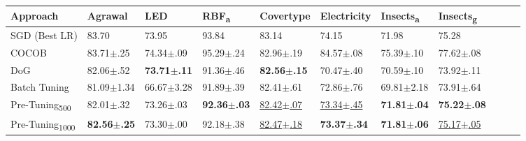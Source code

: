 \begin{tabular}{lllllllllll}
    \toprule
    Approach                       & Agrawal                 & LED                     & RBF\textsubscript{a}    & Covertype                 & Electricity               & Insects\textsubscript{a} & Insects\textsubscript{g}  \\
    \midrule
    SGD (Best LR)                  & 83.70                   & 73.95                   & 93.84                   & 83.14                     & 74.15                     & 71.98                    & 75.28                     \\
    COCOB                          & 83.71$\pm$.25           & 74.34$\pm$.09           & 95.29$\pm$.24           & 82.96$\pm$.19             & 84.57$\pm$.08             & 75.39$\pm$.10            & 77.62$\pm$.08             \\ \midrule
    DoG                            & 82.06$\pm$.52           & \bfseries 73.71$\pm$.11 & 91.36$\pm$.46           & \bfseries 82.56$\pm$.15   & 70.47$\pm$.40             & 70.59$\pm$.10            & 73.92$\pm$.11             \\
    Batch Tuning                   & 81.09$\pm$1.34          & 66.67$\pm$3.28          & 91.89$\pm$.39           & 82.41$\pm$.61             & 72.86$\pm$.76             & 69.81$\pm$2.18           & 73.91$\pm$.64             \\
    Pre-Tuning\textsubscript{500}  & 82.01$\pm$.32           & 73.26$\pm$.03           & \bfseries 92.36$\pm$.03 & \underline{82.42$\pm$.07} & \underline{73.34$\pm$.45} & \bfseries 71.81$\pm$.04  & \bfseries 75.22$\pm$.08   \\
    Pre-Tuning\textsubscript{1000} & \bfseries 82.56$\pm$.25 & 73.30$\pm$.00           & 92.18$\pm$.38           & \underline{82.47$\pm$.18} & \bfseries 73.37$\pm$.34   & \bfseries 71.81$\pm$.06  & \underline{75.17$\pm$.05} \\
    \bottomrule
\end{tabular}
